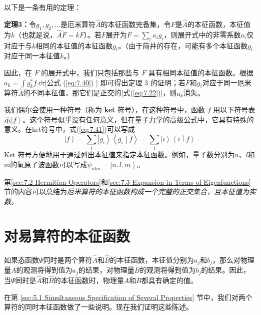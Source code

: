     以下是一条有用的定理：
    \begin{center}
        \parbox{0.8\textwidth}{
            \textbf{定理3：}令$g_1,g_2,\ldots$是厄米算符$\hat{A}$的本征函数完备集，令$F$是$\hat{A}$的本征函数，本征值为$k$（也就是说，$\hat{A}F = kF$）。若$F$展开为$F = \sum_{i}a_ig_i$，则展开式中的非零系数$a_i$仅对应于与$k$相同的本征值的本征函数$g_i$。（由于简并的存在，可能有多个本征函数$g_i$对应于同一本征值$k$。）
            
        }
    \end{center}

    因此，在 $F$ 的展开式中，我们只包括那些与 $F$ 具有相同本征值的本征函数。根据 $a_k = \int g_k^{\ast} f \:\dd \tau$[公式 (\ref{eq:7.40}) ] 即可得出定理 3 的证明；若$F$和$g_i$对应于同一厄米算符$\hat{A}$的不同本征值，那它们是正交的[式(\ref{eq:7.22})]，则$a_k$消失。

    我们偶尔会使用一种符号（称为 \textbf{ket} 符号），在这种符号中，函数 $f$ 用以下符号表示$\left| f \right\rangle$。这个符号似乎没有任何意义，但在量子力学的高级公式中，它具有特殊的意义。在ket符号中，式(\ref{eq:7.41})可以写成
    \begin{equation}
        \left| f \right\rangle = \sum_{i} \left| g_i\right\rangle \left\langle g_i \middle| f \right\rangle = \sum_i \left| i \right\rangle \left\langle i \middle| f \right\rangle
        \label{eq:7.42}
    \end{equation}
    Ket 符号方便地用于通过列出本征值来指定本征函数。例如，量子数分别为$n$、$l$和$m$的氢原子波函数可以写成$\psi_{nlm} = \left| n,l,m \right\rangle$。

    第\ref{sec:7.2 Hermitian Operators}和\ref{sec:7.3 Expansion in Terms of Eigenfunctions}节的内容可以总结为\textit{厄米算符的本征函数构成一个完整的正交集合，且本征值为实数。}

\section{对易算符的本征函数}
\label{sec:7.4 Eigenfunctions of Commuting Operators}
    如果态函数$\Psi$同时是两个算符$\hat{A}$和$\hat{B}$的本征函数，本征值分别为$a_j$和$b_j$，那么对物理量$A$的观测将得到值为$a_j$的结果，对物理量$B$的观测将得到值为$b_j$的结果。因此，当$\Psi$同时是$\hat{A}$和$\hat{B}$的本征函数时，物理量$A$和$B$都具有确定的值。

    在第 \ref{sec:5.1 Simultaneous Specification of Several Properties} 节中，我们对两个算符的同时本征函数做了一些说明。现在我们证明这些陈述。

